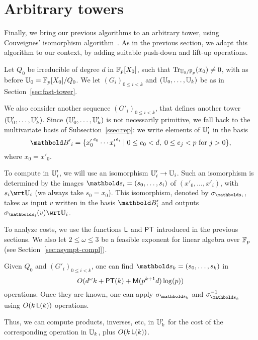 

\section{Arbitrary towers}
\label{sec:couveignes-algorithm}

Finally, we bring our previous algorithms to an arbitrary tower, using
Couveignes' isomorphism algorithm~\cite{couveignes00}. As in the
previous section, we adapt this algorithm to our context, by adding
suitable push-down and lift-up operations.

Let $Q_0$ be irreducible of degree $d$ in $\mathbb{F}_p[X_0]$, such that
$\operatorname{Tr}_{\mathbb{U}_0/\mathbb{F}_p}(x_0)\ne0$, with as before
$\mathbb{U}_0=\mathbb{F}_p[X_0]/Q_0$. We let $(G_i)_{0 \le i < k}$ and
$(\mathbb{U}_0,\ldots,\mathbb{U}_k)$ be as in Section~\ref{sec:fast-tower}.

We also consider another sequence $(G'_i)_{0 \le i < k}$, that defines
another tower $(\mathbb{U}'_0,\ldots,\mathbb{U}'_k)$.  Since $(\mathbb{U}'_0,\ldots,\mathbb{U}'_k)$ is
not necessarily primitive, we fall back to the multivariate basis of
Subsection~\ref{ssec:rep}: we write elements of $\mathbb{U}'_i$ in the basis
  \begin{equation}
  \basis{B'}_i=
  \{{x'_0}^{e_0} \cdots {x'_i}^{e_i} \;|\; 0 \le e_0 < d,\; 0\le e_j < p 
  \text{ for $j>0$}\}
  \text{,}
\end{equation}
where $x_0=x'_0$.

To compute in $\mathbb{U}'_i$, we will use an isomorphism $\mathbb{U}'_i \rightarrow \mathbb{U}_i$.
Such an isomorphism is determined by the images
$\lst{s}_i=(s_0,\dots,s_i)$ of $(x'_0,\dots,x'_i)$, with $s_i \wrt
\U_i$ (we always take $s_0=x_0$). This isomorphism, denoted by
$\sigma_{\lst{s}_i}$, takes as input $v$ written in the basis
$\basis{B}'_i$ and outputs $\sigma_{\lst{s}_i}(v)\wrt \U_i$.

To analyze costs, we use the functions $\mathsf{L}$ and $\mathsf{PT}$ introduced
in the previous sections. We also let $2 \le \omega \le 3$ be a
feasible exponent for linear algebra over $\mathbb{F}_p$ (see
Section~\ref{sec:asympt-compl}).
\begin{theorem}\label{theo:main}
  Given $Q_0$ and $(G'_i)_{0 \le i < k}$, one can find
  $\lst{s}_k=(s_0,\dots,s_k)$ in 
  \begin{equation}
    \label{eq:105}
    O(d^\omega k + \mathsf{PT}(k) +
    \mathsf{M}(p^{k+1} d) \log(p))
  \end{equation}
  operations. Once they are known, one can apply $\sigma_{\lst{s}_k}$
  and $\sigma_{\lst{s}_k}^{-1}$ using $O(k\, \mathsf{L}(k))$ operations.
\end{theorem}
Thus, we can compute products, inverses, etc, in $\mathbb{U}'_k$ for
the cost of the corresponding operation in $\mathbb{U}_k$, plus $O(k\,
\mathsf{L}(k))$.

